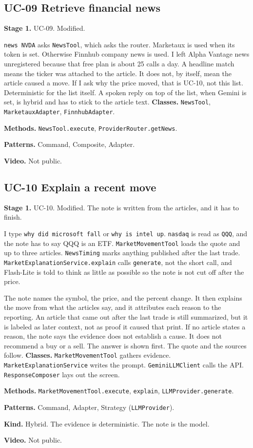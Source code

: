 \documentclass[11pt]{article}
\newcommand{\field}[2]{\textbf{#1.} #2\par}
\begin{document}
\subsection{UC-09 Retrieve financial news}
\field{Stage 1}{UC-09. Modified.}
\texttt{news NVDA} asks \texttt{NewsTool}, which asks the router. Marketaux is used when its token is set. Otherwise Finnhub company news is used. I left Alpha Vantage news unregistered because that free plan is about 25 calls a day. A headline match means the ticker was attached to the article. It does not, by itself, mean the article caused a move. If I ask why the price moved, that is UC-10, not this list. Deterministic for the list itself. A spoken reply on top of the list, when Gemini is set, is hybrid and has to stick to the article text.
\field{Classes}{\texttt{NewsTool}, \texttt{MarketauxAdapter}, \texttt{FinnhubAdapter}.}
\field{Methods}{\texttt{NewsTool.execute}, \texttt{ProviderRouter.getNews}.}
\field{Patterns}{Command, Composite, Adapter.}
\field{Video}{Not public.}

\subsection{UC-10 Explain a recent move}
\field{Stage 1}{UC-10. Modified. The note is written from the articles, and it has to finish.}
I type \texttt{why did microsoft fall} or \texttt{why is intel up}. \texttt{nasdaq} is read as \texttt{QQQ}, and the note has to say QQQ is an ETF. \texttt{MarketMovementTool} loads the quote and up to three articles. \texttt{NewsTiming} marks anything published after the last trade. \texttt{MarketExplanationService.explain} calls \texttt{generate}, not the short call, and Flash-Lite is told to think as little as possible so the note is not cut off after the price.

The note names the symbol, the price, and the percent change. It then explains the move from what the articles say, and it attributes each reason to the reporting. An article that came out after the last trade is still summarized, but it is labeled as later context, not as proof it caused that print. If no article states a reason, the note says the evidence does not establish a cause. It does not recommend a buy or a sell. The answer is shown first. The quote and the sources follow.
\field{Classes}{\texttt{MarketMovementTool} gathers evidence. \texttt{MarketExplanationService} writes the prompt. \texttt{GeminiLLMClient} calls the API. \texttt{ResponseComposer} lays out the screen.}
\field{Methods}{\texttt{MarketMovementTool.execute}, \texttt{explain}, \texttt{LLMProvider.generate}.}
\field{Patterns}{Command, Adapter, Strategy (\texttt{LLMProvider}).}
\field{Kind}{Hybrid. The evidence is deterministic. The note is the model.}
\field{Video}{Not public.}
\end{document}
